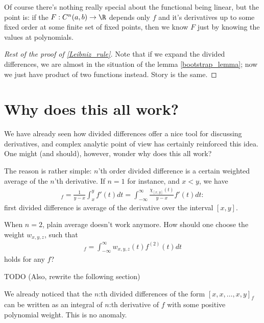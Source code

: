 Of course there's nothing really special about the functional being linear, but the point is: if the $F : C^{n}(a, b) \to \R$ depends only $f$ and it's derivatives up to some fixed order at some finite set of fixed points, then we know $F$ just by knowing the values at polynomials.

\begin{proof}[Rest of the proof of \ref{Leibniz_rule}]
	Note that if we expand the divided differences, we are almost in the situation of the lemma \ref{bootstrap_lemma}; now we just have product of two functions instead. Story is the same.
\end{proof}

\section{Why does this all work?}

We have already seen how divided differences offer a nice tool for discussing derivatives, and complex analytic point of view has certainly reinforced this idea. One might (and should), however, wonder why does this all work?

The reason is rather simple: $n$'th order divided difference is a certain weighted average of the $n$'th derivative. If $n = 1$ for instance, and $x < y$, we have
\begin{align*}
	[x, y]_{f} = \frac{1}{y - x}\int_{x}^{y} f'(t) dt = \int_{-\infty}^{\infty} \frac{\chi_{[x, y]}(t)}{y - x} f'(t) dt:
\end{align*}
first divided difference is average of the derivative over the interval $[x, y]$.

When $n = 2$, plain average doesn't work anymore. How should one choose the weight $w_{x, y, z}$, such that
\begin{align*}
	[x, y, z]_{f} = \int_{-\infty}^{\infty} w_{x, y, z}(t) f^{(2)}(t) dt
\end{align*}
holds for any $f$?

TODO (Also, rewrite the following section)

We already noticed that the $n$:th divided differences of the form $[x, x, \ldots, x, y]_{f}$ can be written as an integral of $n$:th derivative of $f$ with some positive polynomial weight. This is no anomaly.


